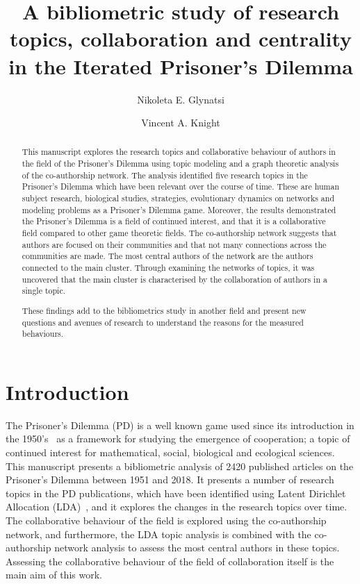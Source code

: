 \documentclass{article}
\title{A bibliometric study of research topics, collaboration and centrality 
       in the Iterated Prisoner's Dilemma}
\author[1, 2, *]{Nikoleta E. Glynatsi}
\author[1]{Vincent A. Knight}
\affil[1]{Cardiff University, School of Mathematics, United Kingdom}
\affil[2]{Max Planck Institute for Evolutionary Biology, Germany}
\affil[*]{Corresponding author: Nikoleta E. Glynatsi, glynatsi@evolbio.mpg.de}
\date{}
\theoremstyle{definition}
\begin{document}
\maketitle

\begin{abstract}
This manuscript explores the research topics and collaborative behaviour of
authors in the field of the Prisoner's Dilemma using topic modeling and a graph
theoretic analysis of the co-authorship network. The analysis identified five
research topics in the Prisoner's Dilemma which have been relevant over the course
of time. These are human subject research, biological studies, strategies,
evolutionary dynamics on networks and modeling problems as a Prisoner's Dilemma
game. Moreover, the results demonstrated the Prisoner's Dilemma is a field of
continued interest, and that it is a collaborative field compared to other
game theoretic fields. The co-authorship
network suggests that authors are focused on their communities and that not many
connections across the communities are made. The most central authors of the network
are the authors connected to the main cluster. Through examining the networks
of topics, it was uncovered that the main cluster is characterised by the
collaboration of authors in a single topic.

These findings add to the bibliometrics study in another field and present new questions 
and avenues of research to understand the reasons for the measured behaviours.
\end{abstract}

\section{Introduction}\label{section:introduction}

The Prisoner's Dilemma (PD) is a well known game used since its introduction in
the 1950's~\citep{Flood1958} as a framework for studying the emergence of
cooperation; a topic of continued interest for mathematical,
social, biological and
ecological sciences. This manuscript presents a bibliometric
analysis of 2420 published articles on the Prisoner's Dilemma between 1951 and
2018. It presents a number of research topics in the PD publications, which have been
identified using Latent Dirichlet Allocation (LDA)~\citep{Blei2003}, and it explores the changes in the
research topics over time. The collaborative behaviour of the field is explored
using the co-authorship network, and furthermore, the LDA
topic analysis is combined with the co-authorship network analysis to assess
the most central authors in these topics. Assessing the collaborative
behaviour of the field of collaboration itself is the main aim of this work.
\end{document}
